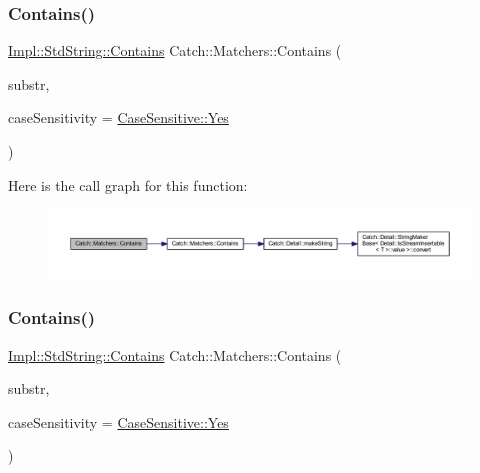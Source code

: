 \subsubsection{\texorpdfstring{Contains()}{Contains()}\hspace{0.1cm}{\footnotesize\ttfamily [1/2]}}
{\footnotesize\ttfamily \hyperlink{struct_catch_1_1_matchers_1_1_impl_1_1_std_string_1_1_contains}{Impl\+::\+Std\+String\+::\+Contains} Catch\+::\+Matchers\+::\+Contains (\begin{DoxyParamCaption}\item[{std\+::string const \&}]{substr,  }\item[{\hyperlink{struct_catch_1_1_case_sensitive_aad49d3aee2d97066642fffa919685c6a}{Case\+Sensitive\+::\+Choice}}]{case\+Sensitivity = {\ttfamily \hyperlink{struct_catch_1_1_case_sensitive_aad49d3aee2d97066642fffa919685c6aa7c5550b69ec3c502e6f609b67f9613c6}{Case\+Sensitive\+::\+Yes}} }\end{DoxyParamCaption})\hspace{0.3cm}{\ttfamily [inline]}}

Here is the call graph for this function\+:\nopagebreak
\begin{figure}[H]
\begin{center}
\leavevmode
\includegraphics[width=350pt]{namespace_catch_1_1_matchers_a07760045eca8bafb7f6618fae10f1b59_cgraph}
\end{center}
\end{figure}
\hypertarget{namespace_catch_1_1_matchers_a7bc27b5c696118cbe54690d6c524b3d9}{}\label{namespace_catch_1_1_matchers_a7bc27b5c696118cbe54690d6c524b3d9} 
\subsubsection{\texorpdfstring{Contains()}{Contains()}\hspace{0.1cm}{\footnotesize\ttfamily [2/2]}}
{\footnotesize\ttfamily \hyperlink{struct_catch_1_1_matchers_1_1_impl_1_1_std_string_1_1_contains}{Impl\+::\+Std\+String\+::\+Contains} Catch\+::\+Matchers\+::\+Contains (\begin{DoxyParamCaption}\item[{const char $\ast$}]{substr,  }\item[{\hyperlink{struct_catch_1_1_case_sensitive_aad49d3aee2d97066642fffa919685c6a}{Case\+Sensitive\+::\+Choice}}]{case\+Sensitivity = {\ttfamily \hyperlink{struct_catch_1_1_case_sensitive_aad49d3aee2d97066642fffa919685c6aa7c5550b69ec3c502e6f609b67f9613c6}{Case\+Sensitive\+::\+Yes}} }\end{DoxyParamCaption})\hspace{0.3cm}{\ttfamily [inline]}}

